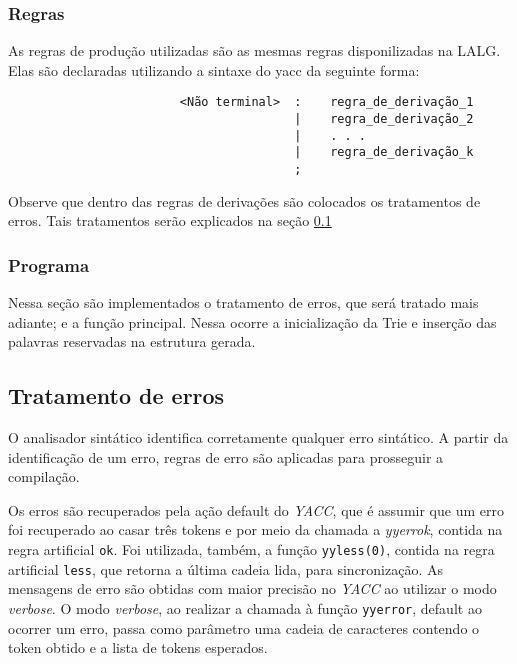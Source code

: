 \documentclass {article}
\begin{document}
		\subsubsection{Regras}
			As regras de produção utilizadas são as mesmas regras disponilizadas na LALG. Elas são declaradas utilizando a sintaxe do yacc da seguinte forma:
			\begin{center}
				\begin{minipage}[ht]{0.5\textwidth}
					\begin{verbatim}
						<Não terminal>  :    regra_de_derivação_1
						                |    regra_de_derivação_2
						                |    . . .
						                |    regra_de_derivação_k
						                ;
					\end{verbatim}
				\end{minipage}
			\end{center}

			Observe que dentro das regras de derivações são colocados os tratamentos de erros. Tais tratamentos serão explicados na seção \ref{section:error}
			
		\subsubsection{Programa}
			Nessa seção são implementados o tratamento de erros, que será tratado mais adiante; e a função principal. Nessa ocorre a inicialização da Trie e inserção das palavras reservadas na estrutura gerada.

	\subsection{Tratamento de erros} \label{section:error}
		O analisador sintático identifica corretamente qualquer erro sintático. 
		A partir da identificação de um erro, regras de erro são aplicadas para prosseguir a compilação.

		Os erros são recuperados pela ação default do \emph{YACC}, que é assumir que um erro foi recuperado ao casar três tokens e por meio da chamada a \emph{yyerrok}, contida na regra artificial \verb=ok=. Foi utilizada, também, a função \verb=yyless(0)=, contida na regra artificial \verb=less=, que retorna a última cadeia lida, para sincronização.
		As mensagens de erro são obtidas com maior precisão no \emph{YACC} ao utilizar o modo \emph{verbose}. O modo \emph{verbose}, ao realizar a chamada à função \verb=yyerror=, default ao ocorrer um erro, passa como parâmetro uma cadeia de caracteres contendo o token obtido e a lista de tokens esperados.
\end{document}
